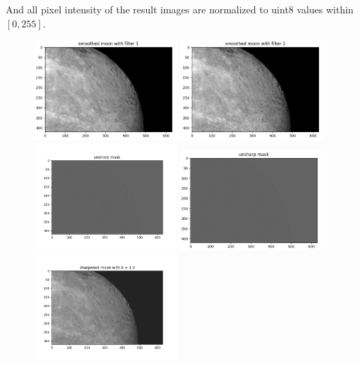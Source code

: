 And all pixel intensity of the result images are normalized to uint8 values within $[0,255]$.\\
\begin{figure}[htbp]
    \centering
	\includegraphics[width=0.48\textwidth]{../images/p2/p2c_smooth_1.png}
    \includegraphics[width=0.48\textwidth]{../images/p2/p2c_smooth_2.png}
	\includegraphics[width=0.48\textwidth]{../images/p2/p2c_unsharp_1.png}
	\includegraphics[width=0.48\textwidth]{../images/p2/p2c_unsharp_2.png}
	\includegraphics[width=0.48\textwidth]{../images/p2/p2c_sharpened_1_1.png}

\end{figure}
